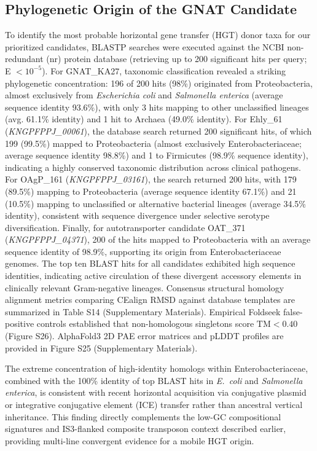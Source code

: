\documentclass[pdflatex,sn-mathphys-num]{sn-jnl}
\begin{document}
\subsection{Phylogenetic Origin of the GNAT Candidate}\label{subsec:hgt_results}
To identify the most probable horizontal gene transfer (HGT) donor taxa for our prioritized candidates, BLASTP searches were executed against the NCBI non-redundant (nr) protein database (retrieving up to 200 significant hits per query; E $< 10^{-5}$). For GNAT\_KA27, taxonomic classification revealed a striking phylogenetic concentration: 196 of 200 hits (98\%) originated from Proteobacteria, almost exclusively from \textit{Escherichia coli} and \textit{Salmonella enterica} (average sequence identity 93.6\%), with only 3 hits mapping to other unclassified lineages (avg. 61.1\% identity) and 1 hit to Archaea (49.0\% identity). For Ehly\_61 (\textit{KNGPFPPJ\_00061}), the database search returned 200 significant hits, of which 199 (99.5\%) mapped to Proteobacteria (almost exclusively Enterobacteriaceae; average sequence identity 98.8\%) and 1 to Firmicutes (98.9\% sequence identity), indicating a highly conserved taxonomic distribution across clinical pathogens. For OAgP\_161 (\textit{KNGPFPPJ\_03161}), the search returned 200 hits, with 179 (89.5\%) mapping to Proteobacteria (average sequence identity 67.1\%) and 21 (10.5\%) mapping to unclassified or alternative bacterial lineages (average 34.5\% identity), consistent with sequence divergence under selective serotype diversification. Finally, for autotransporter candidate OAT\_371 (\textit{KNGPFPPJ\_04371}), 200 of the hits mapped to Proteobacteria with an average sequence identity of 98.9\%, supporting its origin from Enterobacteriaceae genomes. The top ten BLAST hits for all candidates exhibited high sequence identities, indicating active circulation of these divergent accessory elements in clinically relevant Gram-negative lineages. Consensus structural homology alignment metrics comparing CEalign RMSD against database templates are summarized in Table S14 (Supplementary Materials). Empirical Foldseek false-positive controls established that non-homologous singletons score $\text{TM} < 0.40$ (Figure S26). AlphaFold3 2D PAE error matrices and pLDDT profiles are provided in Figure S25 (Supplementary Materials).

The extreme concentration of high-identity homologs within Enterobacteriaceae, combined with the 100\% identity of top BLAST hits in \textit{E.~coli} and \textit{Salmonella enterica}, is consistent with recent horizontal acquisition via conjugative plasmid or integrative conjugative element (ICE) transfer rather than ancestral vertical inheritance. This finding directly complements the low-GC compositional signatures and IS3-flanked composite transposon context described earlier, providing multi-line convergent evidence for a mobile HGT origin.
\end{document}
